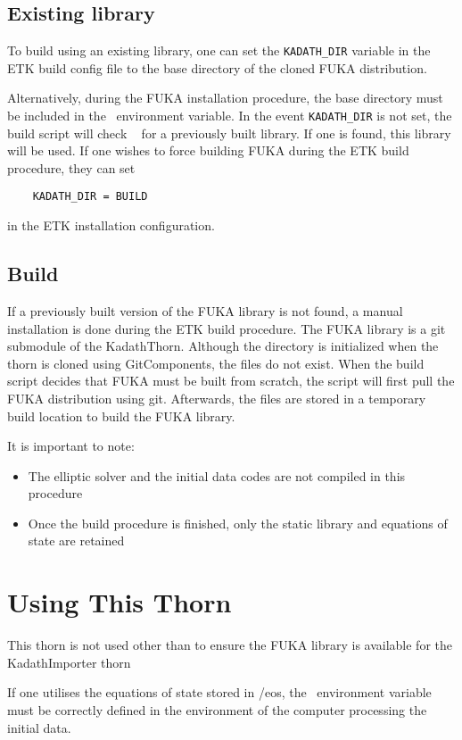 \subsection*{Existing library}
To build using an existing library, one can set the \texttt{KADATH\_DIR} variable in the ETK build
config file to the base directory of the cloned FUKA distribution.  

Alternatively, during the FUKA installation 
procedure, the base directory must be included in the \hk~environment variable.  In the event
\texttt{KADATH\_DIR} is not set, the build script will check \hk~ for a previously built library.
If one is found, this library will be used.  If one wishes to force building FUKA during the ETK
build procedure, they can set
\begin{verbatim}
    KADATH_DIR = BUILD
\end{verbatim}
in the ETK installation configuration.

\subsection*{Build}
If a previously built version of the FUKA library is not found, a manual installation is done during
the ETK build procedure.  The FUKA library is a git submodule of the KadathThorn.  Although the
directory is initialized when the thorn is cloned using GitComponents, the files do not exist.
When the build script decides that FUKA must be built from scratch, 
the script will first pull the FUKA distribution using git.  Afterwards, the files are stored in
a temporary build location to build the FUKA library.

It is important to note:
\begin{itemize}
    \item The elliptic solver and the initial data codes are not compiled in this procedure
    \item Once the build procedure is finished, only the static library and equations of state are retained
\end{itemize}

\section{Using This Thorn}
This thorn is not used other than to ensure the FUKA library is available for the KadathImporter thorn

If one utilises the equations of state stored in \hk/eos, the \hk~environment variable must be
correctly defined in the environment of the computer processing the initial data.

